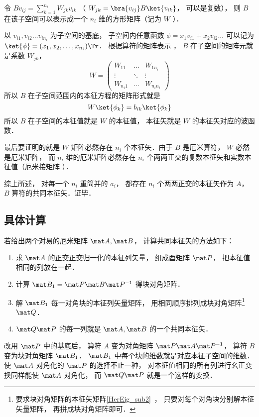 令 $B v_{ij} = \sum_{k=1}^{n_i} W_{jk}v_{ik}$ （ $W_{jk} = \bra{v_{ij}} B \ket{v_{ik}}$， 可以是复数）， 则 $B$ 在该子空间可以表示成一个 $n_i$ 维的方形矩阵（记为 $W$ ）．

以 $v_{i1}, v_{i2} \dots v_{i n_i}$ 为子空间的基底， 子空间内任意函数 $\phi  = x_1 v_{i1} + x_2 v_{i2}\dots$ 可以记为 $\ket{\phi} = (x_1, x_2, \dots, x_{n_i})\Tr$． 根据算符的矩阵表示
， $B$ 在子空间的矩阵元就是系数 $W_{jk}$， 
\begin{equation}
W = \begin{pmatrix}
W_{11} & \ldots & W_{1 n_i}\\
\vdots & \ddots & \vdots \\
W_{n_i 1} & \ldots & W_{n_i n_i}
\end{pmatrix}
\end{equation}
所以 $B$ 在子空间范围内的本征方程的矩阵形式就是
\begin{equation}
W \ket{\phi_k} = b_{ik} \ket{\phi_k}
\end{equation}
所以 $B$ 在子空间的本征值就是 $W$ 的本征值， 本征矢就是 $W$ 的本征矢对应的波函数．

最后要证明的就是 $W$ 矩阵必然存在 $n_i$ 个本征矢．由于 $B$ 是厄米算符，  $W$ 必然是厄米矩阵， 而 $n_i$ 维的厄米矩阵必然存在 $n_i$ 个两两正交的复数本征矢和实数本征值（厄米接矩阵%
）．

综上所述， 对每一个 $n_i$ 重简并的 $a_i$，  都存在 $n_i$ 个两两正交的本征矢作为 $A$，  $B$ 算符的共同本征矢．证毕．

\subsection{具体计算}
若给出两个对易的厄米矩阵 $\mat A, \mat B$， 计算共同本征矢的方法如下：
\begin{enumerate}
\item 求 $\mat A$ 的正交正交归一化的本征列矢量， 组成酉矩阵 $\mat P$， 把本征值相同的列放在一起．
\item 计算 $\mat B_1 = \mat P \mat B\mat P^{-1}$ 得块对角矩阵．
\item 解 $\mat B_1$ 每一对角块的本征列矢量矩阵， 用相同顺序排列成块对角矩阵\footnote{要求块对角矩阵的本征矢矩阵\autoref{HerEig_sub2}~， 只要对每个对角块分别解本征矢量矩阵， 再拼成块对角矩阵即可．} $\mat Q$．
\item $\mat Q\mat P$ 的每一列就是 $\mat A, \mat B$ 的一个共同本征矢．
\end{enumerate}



改用 $\mat P$ 中的基底后， 算符 $A$ 变为对角矩阵 $\mat P \mat A\mat P^{-1}$， 算符 $B$ 变为块对角矩阵 $\mat B_1$． $\mat B_1$ 中每个块的维数就是对应本征子空间的维数． 使 $\mat A$ 对角化的 $\mat P$ 的选择不止一种， 对本征值相同的所有列进行幺正变换同样能使 $\mat A$ 对角化， 而 $\mat Q\mat P$ 就是一个这样的变换．

